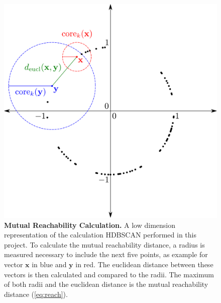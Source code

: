 \begin{figure}[!hbt]
    \centering
    \includegraphics[width=\textwidth]{Graphics/HDB.pdf}
    \caption[Mutual Reachability Calculation]{\textbf{Mutual Reachability Calculation.} A low dimension representation of the calculation \gls{HDBSCAN} performed in this project. To calculate the mutual reachability distance, a radius is measured necessary to include the next five points, as example for vector $\mathbf{x}$ in blue and $\mathbf{y}$ in red. The euclidean distance between these vectors is then calculated and compared to the radii. The maximum of both radii and the euclidean distance is the mutual reachability distance (\autoref{eq:reach}).}
    \label{fig:HDB}
\end{figure}

